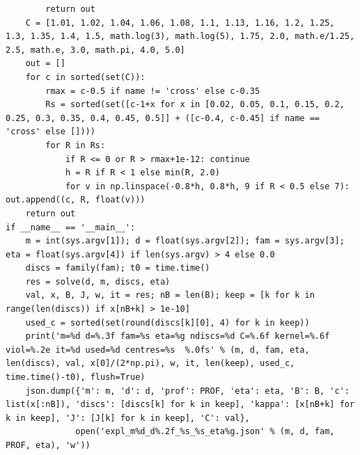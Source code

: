 \documentclass[11pt,reqno]{amsart}
\numberwithin{equation}{section}
\theoremstyle{definition}
\theoremstyle{remark}
\begin{document}
\begin{lstlisting}
        return out
    C = [1.01, 1.02, 1.04, 1.06, 1.08, 1.1, 1.13, 1.16, 1.2, 1.25, 1.3, 1.35, 1.4, 1.5, math.log(3), math.log(5), 1.75, 2.0, math.e/1.25, 2.5, math.e, 3.0, math.pi, 4.0, 5.0]
    out = []
    for c in sorted(set(C)):
        rmax = c-0.5 if name != 'cross' else c-0.35
        Rs = sorted(set([c-1+x for x in [0.02, 0.05, 0.1, 0.15, 0.2, 0.25, 0.3, 0.35, 0.4, 0.45, 0.5]] + ([c-0.4, c-0.45] if name == 'cross' else [])))
        for R in Rs:
            if R <= 0 or R > rmax+1e-12: continue
            h = R if R < 1 else min(R, 2.0)
            for v in np.linspace(-0.8*h, 0.8*h, 9 if R < 0.5 else 7): out.append((c, R, float(v)))
    return out
if __name__ == '__main__':
    m = int(sys.argv[1]); d = float(sys.argv[2]); fam = sys.argv[3]; eta = float(sys.argv[4]) if len(sys.argv) > 4 else 0.0
    discs = family(fam); t0 = time.time()
    res = solve(d, m, discs, eta)
    val, x, B, J, w, it = res; nB = len(B); keep = [k for k in range(len(discs)) if x[nB+k] > 1e-10]
    used_c = sorted(set(round(discs[k][0], 4) for k in keep))
    print('m=%d d=%.3f fam=%s eta=%g ndiscs=%d C=%.6f kernel=%.6f viol=%.2e it=%d used=%d centres=%s  %.0fs' % (m, d, fam, eta, len(discs), val, x[0]/(2*np.pi), w, it, len(keep), used_c, time.time()-t0), flush=True)
    json.dump({'m': m, 'd': d, 'prof': PROF, 'eta': eta, 'B': B, 'c': list(x[:nB]), 'discs': [discs[k] for k in keep], 'kappa': [x[nB+k] for k in keep], 'J': [J[k] for k in keep], 'C': val},
              open('expl_m%d_d%.2f_%s_%s_eta%g.json' % (m, d, fam, PROF, eta), 'w'))
\end{lstlisting}
\end{document}
